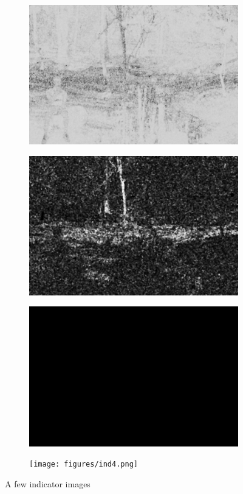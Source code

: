 \begin{figure}
    \centering
    \begin{subfigure}{.48\textwidth}
    \centering
      \includegraphics[width=.8\linewidth]{figures/ind1.png}
    \end{subfigure}
    \begin{subfigure}{.48\textwidth}
    \centering
      \includegraphics[width=.8\linewidth]{figures/ind2.png}
    \end{subfigure}
    \begin{subfigure}{.48\textwidth}
        \centering
      \includegraphics[width=.8\linewidth]{figures/ind3.png}
    \end{subfigure}
    \begin{subfigure}{.48\textwidth}
        \centering
      \texttt{[image: figures/ind4.png]}
    \end{subfigure}
    \caption{A few indicator images}
    \label{fig:indicator_images}
\end{figure}

